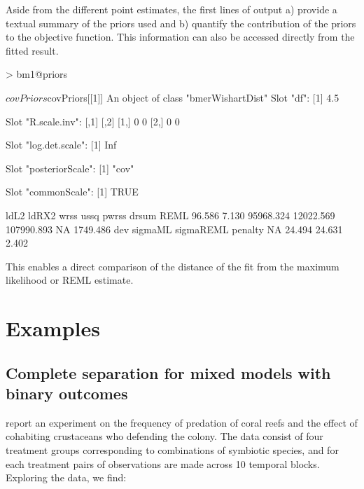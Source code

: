 \documentclass[article,shortnames]{jss}
\begin{document}
Aside from the different point estimates, the first lines of output a)
provide a textual summary of the priors used and b) quantify the
contribution of the priors to the objective function. This information
can also be accessed directly from the fitted result.

\begin{Schunk}
\begin{Sinput}
> bm1@priors
\end{Sinput}
\begin{Soutput}
$covPriors
$covPriors[[1]]
An object of class "bmerWishartDist"
Slot "df":
[1] 4.5

Slot "R.scale.inv":
     [,1] [,2]
[1,]    0    0
[2,]    0    0

Slot "log.det.scale":
[1] Inf

Slot "posteriorScale":
[1] "cov"

Slot "commonScale":
[1] TRUE
\end{Soutput}
\begin{Soutput}
      ldL2      ldRX2       wrss       ussq      pwrss      drsum       REML 
    96.586      7.130  95968.324  12022.569 107990.893         NA   1749.486 
       dev    sigmaML  sigmaREML    penalty 
        NA     24.494     24.631      2.402 
\end{Soutput}
\end{Schunk}

This enables a direct comparison of the distance of the fit from the
maximum likelihood or REML estimate.


\section{Examples}

\subsection{Complete separation for mixed models with binary outcomes}
\label{sec:eg:fixef}


\citet{mckeon:2012:defender} report an experiment on the frequency of
predation of coral reefs and the effect of cohabiting crustaceans who
defending the colony. The data consist of four treatment groups corresponding
to combinations of symbiotic species, and for each treatment pairs of observations are
made across 10 temporal blocks. Exploring the data, we find:
\end{document}
